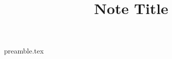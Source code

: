 
\RequirePackage{import}
{preamble.tex}

\title{Note Title}


    \maketitle {}
    \printbibliography

